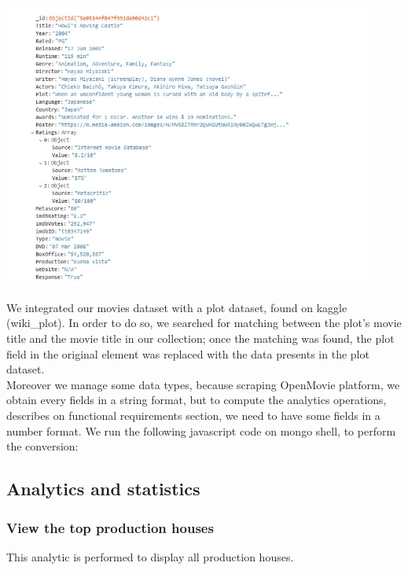 \documentclass[a4paper, oneside]{article}
\begin{document}
\begin{minipage}{\linewidth}
\begin{center}
\vspace{1mm}
\includegraphics[height = 94mm]{./images/screens/elementJSONExample.jpg} 
\vspace{6mm}
\label{fig:elementJSONExample}
\vspace{5mm}
\end{center}
\end{minipage}
We integrated our movies dataset with a plot dataset, found on kaggle (wiki\_plot). In order to do so, we searched for matching between the plot’s movie title and the movie title in our collection; once the matching was found, the plot field in the original element was replaced with the data presents in the plot dataset.\\
Moreover we manage some data types, because scraping OpenMovie platform, we obtain every fields in a string format, but to compute the analytics operations, describes on functional requirements section, we need to have some fields in a number format. We run the following javascript code on mongo shell, to perform the conversion:
\vspace{2mm}

\vspace{5mm}

\subsection{Analytics and statistics}
\subsubsection{View the top production houses}
This analytic is performed to display all production houses.
\end{document}
